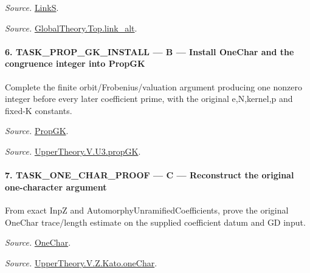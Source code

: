 \documentclass[11pt,a4paper]{article}
\numberwithin{equation}{section}
\theoremstyle{remark}\newtheorem{remark}[theorem]{Remark}
\begin{document}
\emph{Source.} \href{https://github.com/CocoSgt/riemann-hypothesis-lean/blob/7cbf7a0c32fca1badf05931879a37c3f8a2b03b4/src/Formalism/SharpRestriction/GlobalTheoremInputs.lean#L152-L157}{LinkS}.

\emph{Source.} \href{https://github.com/CocoSgt/riemann-hypothesis-lean/blob/7cbf7a0c32fca1badf05931879a37c3f8a2b03b4/src/Development/AbelianVarietyTheory/Proofs/GlobalInterpolation/LinkAlt.lean#L16-L50}{GlobalTheory.Top.link\_\allowbreak alt}.



\paragraph{6. TASK\_\allowbreak PROP\_\allowbreak GK\_\allowbreak INSTALL — B — Install OneChar and the congruence integer into PropGK}

Complete the finite orbit/Frobenius/valuation argument producing one nonzero integer before every later coefficient prime, with the original e,N,kernel,p and fixed-K constants.

\emph{Source.} \href{https://github.com/CocoSgt/riemann-hypothesis-lean/blob/7cbf7a0c32fca1badf05931879a37c3f8a2b03b4/src/Development/AutomorphicArithmetic/AutomorphicVarieties/UnitaryThreeGroups/KatoUse.lean#L36-L42}{PropGK}.

\emph{Source.} \href{https://github.com/CocoSgt/riemann-hypothesis-lean/blob/7cbf7a0c32fca1badf05931879a37c3f8a2b03b4/src/Development/AutomorphicArithmetic/AutomorphicVarieties/UnitaryThreeGroups/OrbEquiv.lean#L111-L173}{UpperTheory.V.U3.propGK}.



\paragraph{7. TASK\_\allowbreak ONE\_\allowbreak CHAR\_\allowbreak PROOF — C — Reconstruct the original one-character argument}

From exact InpZ and AutomorphyUnramifiedCoefficients, prove the original OneChar trace/length estimate on the supplied coefficient datum and GD input.

\emph{Source.} \href{https://github.com/CocoSgt/riemann-hypothesis-lean/blob/7cbf7a0c32fca1badf05931879a37c3f8a2b03b4/src/Development/AutomorphicArithmetic/AutomorphicVarieties/UnitaryThreeGroups/KatoUse.lean#L54-L64}{OneChar}.

\emph{Source.} \href{https://github.com/CocoSgt/riemann-hypothesis-lean/blob/7cbf7a0c32fca1badf05931879a37c3f8a2b03b4/src/Development/AutomorphicArithmetic/AutomorphicVarieties/ModularityArgument/KatoQuadraticCharacters/OneChar.lean#L158-L178}{UpperTheory.V.Z.Kato.oneChar}.
\end{document}
